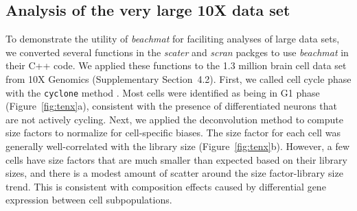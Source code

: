 \documentclass[10pt,letterpaper]{article}
\newcommand{\suppsecrealtenx}{4.2}
\newcommand{\beachmat}{\textit{beachmat}}
\newcommand{\code}[1]{\texttt{#1}}
\begin{document}
\subsection*{Analysis of the very large 10X data set}
To demonstrate the utility of \beachmat{} for faciliting analyses of large data sets, we converted several functions in the \textit{scater} \cite{mccarthy2017scater} and \textit{scran} packges \cite{lun2016stepbystep} to use \beachmat{} in their C++ code.
We applied these functions to the 1.3 million brain cell data set from 10X Genomics (Supplementary Section~\suppsecrealtenx{}).
First, we called cell cycle phase with the \code{cyclone} method \cite{scialdone2015computational}. 
Most cells were identified as being in G1 phase (Figure~\ref{fig:tenx}a), consistent with the presence of differentiated neurons that are not actively cycling.
Next, we applied the deconvolution method \cite{lun2016pooling} to compute size factors to normalize for cell-specific biases.
The size factor for each cell was generally well-correlated with the library size (Figure~\ref{fig:tenx}b).
However, a few cells have size factors that are much smaller than expected based on their library sizes, and there is a modest amount of scatter around the size factor-library size trend.
This is consistent with composition effects \cite{robinson2010scaling} caused by differential gene expression between cell subpopulations.
\end{document}
